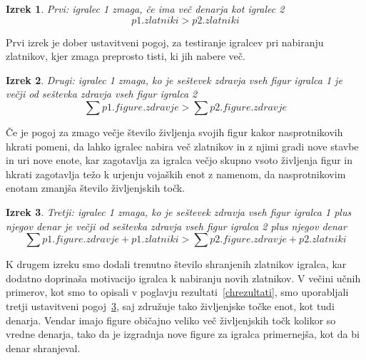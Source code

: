 \documentclass[a4paper, 12pt]{book}
\newtheorem{izrek}{Izrek}[chapter]
\begin{document}
\begin{izrek}
	\label{ustavitvenipogoj1}
Prvi: igralec 1 zmaga, če ima več denarja kot igralec 2
	\begin{equation}
p1.zlatniki > p2.zlatniki
	\label{eq:ustavitvenipogoj1}
	\end{equation}
\end{izrek}
\noindent
Prvi izrek je dober ustavitveni pogoj, za testiranje igralcev pri nabiranju zlatnikov, kjer zmaga preprosto tisti, ki jih nabere več.

\begin{izrek}
	\label{ustavitvenipogoj2}
Drugi: igralec 1 zmaga, ko je seštevek zdravja vseh figur igralca 1 je večji od seštevka zdravja vseh figur igralca 2
	\begin{equation}
	\sum{p1.figure.zdravje} > \sum{p2.figure.zdravje}
	\label{eq:ustavitvenipogoj2}
	\end{equation}
\end{izrek}
\noindent
Če je pogoj za zmago večje število življenja svojih figur kakor nasprotnikovih hkrati pomeni, da lahko igralec nabira več zlatnikov in z njimi gradi nove stavbe in uri nove enote, kar zagotavlja za igralca večjo skupno vsoto življenja figur in hkrati zagotavlja težo k urjenju vojaških enot z namenom, da nasprotnikovim enotam zmanjša število življenjskih točk.

\begin{izrek}
	\label{ustavitvenipogoj3}
Tretji: igralec 1 zmaga, ko je seštevek zdravja vseh figur igralca 1 plus njegov denar je večji od seštevka zdravja vseh figur igralca 2 plus njegov denar
	\begin{equation}
	\sum{p1.figure.zdravje} + p1.zlatniki > \sum{p2.figure.zdravje} + p2.zlatniki
	\label{eq:ustavitvenipogoj3}
	\end{equation}
\end{izrek}
\noindent
K drugem izreku smo dodali trenutno število shranjenih zlatnikov igralca, kar dodatno doprinaša motivacijo igralca k nabiranju novih zlatnikov.
V večini učnih primerov, kot smo to opisali v poglavju rezultati~\ref{chrezultati}, smo uporabljali tretji ustavitveni pogoj~\ref{ustavitvenipogoj3}, saj združuje tako življenjske točke enot, kot tudi denarja.
Vendar imajo figure običajno veliko več življenjskih točk kolikor so vredne denarja, tako da je izgradnja nove figure za igralca primernejša, kot da bi denar shranjeval.

\end{document}
